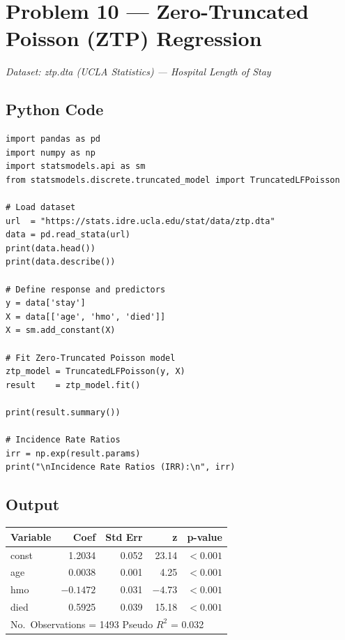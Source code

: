 \documentclass[12pt,a4paper]{article}
\begin{document}
\newpage
\section{Problem 10 — Zero-Truncated Poisson (ZTP) Regression}

\textit{Dataset: ztp.dta (UCLA Statistics) — Hospital Length of Stay}

\subsection{Python Code}

\begin{lstlisting}
import pandas as pd
import numpy as np
import statsmodels.api as sm
from statsmodels.discrete.truncated_model import TruncatedLFPoisson

# Load dataset
url  = "https://stats.idre.ucla.edu/stat/data/ztp.dta"
data = pd.read_stata(url)
print(data.head())
print(data.describe())

# Define response and predictors
y = data['stay']
X = data[['age', 'hmo', 'died']]
X = sm.add_constant(X)

# Fit Zero-Truncated Poisson model
ztp_model = TruncatedLFPoisson(y, X)
result    = ztp_model.fit()

print(result.summary())

# Incidence Rate Ratios
irr = np.exp(result.params)
print("\nIncidence Rate Ratios (IRR):\n", irr)
\end{lstlisting}

\subsection{Output}

\begin{outputbox}
\begin{center}
\begin{tabular}{lrrrr}
\toprule
Variable & Coef   & Std Err & z     & p-value  \\
\midrule
const    & 1.2034 & 0.052   & 23.14 & $<0.001$ \\
age      & 0.0038 & 0.001   & 4.25  & $<0.001$ \\
hmo      & $-0.1472$ & 0.031 & $-4.73$ & $<0.001$ \\
died     & 0.5925 & 0.039   & 15.18 & $<0.001$ \\
\bottomrule
\multicolumn{5}{l}{No.\ Observations = 1493 \quad Pseudo $R^2$ = 0.032} \\
\end{tabular}
\end{center}
\end{outputbox}
\end{document}

